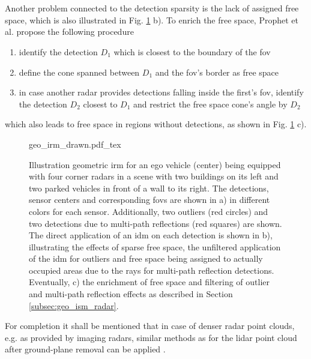 \\\\
Another problem connected to the detection sparsity is the lack of assigned free space, which is also illustrated in Fig. \ref{fig:geo_irm_drawn} b). To enrich the free space, Prophet et al. \cite{prophet2018adaptions} propose the following procedure
\begin{enumerate}
	\item identify the detection $D_1$ which is closest to the boundary of the \gls{fov}
	\item define the cone spanned between $D_1$ and the \gls{fov}'s border as free space
	\item in case another radar provides detections falling inside the first's \gls{fov}, identify the detection $D_2$ closest to $D_1$ and restrict the free space cone's angle by $D_2$   
\end{enumerate}
which also leads to free space in regions without detections, as shown in Fig. \ref{fig:geo_irm_drawn} c).
\begin{figure}[htb!]
	\begin{center}
		{geo_irm_drawn.pdf_tex}
		\caption{\label{fig:geo_irm_drawn}Illustration geometric \gls{irm} for an ego vehicle (center) being equipped with four corner radars in a scene with two buildings on its left and two parked vehicles in front of a wall to its right. The detections, sensor centers and corresponding \gls{fov}s are shown in a) in different colors for each sensor. Additionally, two outliers (red circles) and two detections due to multi-path reflections (red squares) are shown. The direct application of an \gls{idm} on each detection is shown in b), illustrating the effects of sparse free space, the unfiltered application of the \gls{idm} for outliers and free space being assigned to actually occupied areas due to the rays for multi-path reflection detections. Eventually, c) the enrichment of free space and filtering of outlier and multi-path reflection effects as described in Section \ref{subsec:geo_ism_radar}.}
	\end{center}
\end{figure} 
For completion it shall be mentioned that in case of denser radar point clouds, e.g. as provided by imaging radars, similar methods as for the lidar point cloud after ground-plane removal can be applied \cite{slutsky2019dual}.
%
